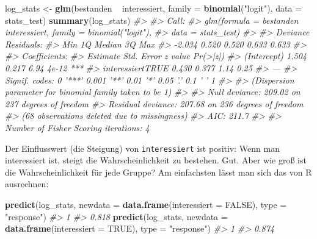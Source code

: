 \documentclass[12pt,ngerman,]{book}
\makeatletter
\newenvironment{Shaded}{\begin{snugshade}}{\end{snugshade}}
\newcommand{\KeywordTok}[1]{\textcolor[rgb]{0.13,0.29,0.53}{\textbf{{#1}}}}
\newcommand{\DataTypeTok}[1]{\textcolor[rgb]{0.13,0.29,0.53}{{#1}}}
\newcommand{\StringTok}[1]{\textcolor[rgb]{0.31,0.60,0.02}{{#1}}}
\newcommand{\CommentTok}[1]{\textcolor[rgb]{0.56,0.35,0.01}{\textit{{#1}}}}
\newcommand{\OtherTok}[1]{\textcolor[rgb]{0.56,0.35,0.01}{{#1}}}
\newcommand{\NormalTok}[1]{{#1}}
\newenvironment{kframe}{%
\medskip{}
\setlength{\fboxsep}{.8em}
 \def\at@end@of@kframe{}%
 \ifinner\ifhmode%
  \def\at@end@of@kframe{\end{minipage}}%
  \begin{minipage}{\columnwidth}%
 \fi\fi%
 \def\FrameCommand##1{\hskip\@totalleftmargin \hskip-\fboxsep
 \colorbox{shadecolor}{##1}\hskip-\fboxsep
     \hskip-\linewidth \hskip-\@totalleftmargin \hskip\columnwidth}%
 \MakeFramed {\advance\hsize-\width
   \@totalleftmargin\z@ \linewidth\hsize
   \@setminipage}}%
 {\par\unskip\endMakeFramed%
 \at@end@of@kframe}
\renewenvironment{Shaded}{\begin{kframe}}{\end{kframe}}
\theoremstyle{definition}
\theoremstyle{definition}
\theoremstyle{remark}
\makeatother
\begin{document}
\begin{Shaded}
\begin{Highlighting}[]
\NormalTok{log_stats <-}\StringTok{ }\KeywordTok{glm}\NormalTok{(bestanden ~}\StringTok{ }\NormalTok{interessiert, }
               \DataTypeTok{family =} \KeywordTok{binomial}\NormalTok{(}\StringTok{"logit"}\NormalTok{),}
               \DataTypeTok{data =} \NormalTok{stats_test)}
\KeywordTok{summary}\NormalTok{(log_stats)}
\CommentTok{#> }
\CommentTok{#> Call:}
\CommentTok{#> glm(formula = bestanden ~ interessiert, family = binomial("logit"), }
\CommentTok{#>     data = stats_test)}
\CommentTok{#> }
\CommentTok{#> Deviance Residuals: }
\CommentTok{#>    Min      1Q  Median      3Q     Max  }
\CommentTok{#> -2.034   0.520   0.520   0.633   0.633  }
\CommentTok{#> }
\CommentTok{#> Coefficients:}
\CommentTok{#>                  Estimate Std. Error z value Pr(>|z|)    }
\CommentTok{#> (Intercept)         1.504      0.217    6.94    4e-12 ***}
\CommentTok{#> interessiertTRUE    0.430      0.377    1.14     0.25    }
\CommentTok{#> ---}
\CommentTok{#> Signif. codes:  0 '***' 0.001 '**' 0.01 '*' 0.05 '.' 0.1 ' ' 1}
\CommentTok{#> }
\CommentTok{#> (Dispersion parameter for binomial family taken to be 1)}
\CommentTok{#> }
\CommentTok{#>     Null deviance: 209.02  on 237  degrees of freedom}
\CommentTok{#> Residual deviance: 207.68  on 236  degrees of freedom}
\CommentTok{#>   (68 observations deleted due to missingness)}
\CommentTok{#> AIC: 211.7}
\CommentTok{#> }
\CommentTok{#> Number of Fisher Scoring iterations: 4}
\end{Highlighting}
\end{Shaded}

Der Einflusswert (die Steigung) von \texttt{interessiert} ist positiv:
Wenn man interessiert ist, steigt die Wahrscheinlichkeit zu bestehen.
Gut. Aber wie groß ist die Wahrscheinlichkeit für jede Gruppe? Am
einfachsten lässt man sich das von R ausrechnen:

\begin{Shaded}
\begin{Highlighting}[]
\KeywordTok{predict}\NormalTok{(log_stats, }\DataTypeTok{newdata =} \KeywordTok{data.frame}\NormalTok{(}\DataTypeTok{interessiert =} \OtherTok{FALSE}\NormalTok{), }
        \DataTypeTok{type =} \StringTok{"response"}\NormalTok{)}
\CommentTok{#>     1 }
\CommentTok{#> 0.818}
\KeywordTok{predict}\NormalTok{(log_stats, }\DataTypeTok{newdata =} \KeywordTok{data.frame}\NormalTok{(}\DataTypeTok{interessiert =} \OtherTok{TRUE}\NormalTok{), }
        \DataTypeTok{type =} \StringTok{"response"}\NormalTok{)}
\CommentTok{#>     1 }
\CommentTok{#> 0.874}
\end{Highlighting}
\end{Shaded}
\end{document}
